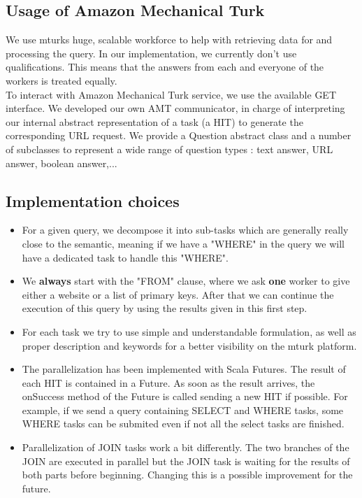 \documentclass{article}
\begin{document}
\subsection{Usage of Amazon Mechanical Turk}
We use mturks huge, scalable workforce to help with retrieving data for and processing the query. In our implementation, we currently don't use qualifications. This means that the answers from each and everyone of the workers is treated equally.\\
To interact with Amazon Mechanical Turk service, we use the available GET interface. We developed our own AMT communicator, in charge of interpreting our internal abstract representation of a task (a HIT) to generate the corresponding URL request. We provide a Question abstract class and a number of subclasses to represent a wide range of question types : text answer, URL answer, boolean answer,...
\subsection{Implementation choices}
\begin{itemize}
\item For a given query, we decompose it into sub-tasks which are generally really close to the semantic, meaning if we have a "WHERE" in the query we will have a dedicated task to handle this "WHERE".
\item We \textbf{always} start with the "FROM" clause, where we ask \textbf{one} worker to give either a website or a list of primary keys. After that we can continue the execution of this query by using the results given in this first step.
\item For each task we try to use simple and understandable formulation, as well as proper description and keywords for a better visibility on the mturk platform. 
\item The parallelization has been implemented with Scala Futures. The result of each HIT is contained in a Future. As soon as the result arrives, the onSuccess method of the Future is called sending a new HIT if possible. For example, if we send a query containing SELECT and WHERE tasks, some WHERE tasks can be submited even if not all the select tasks are finished.
\item Parallelization of JOIN tasks work a bit differently. The two branches of the JOIN are executed in parallel but the JOIN task is waiting for the results of both parts before beginning. Changing this is a possible improvement for the future.
\end{itemize}
\end{document}
